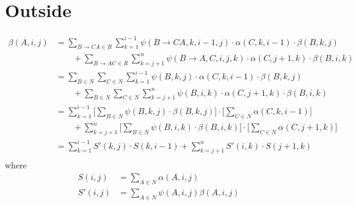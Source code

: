 \documentclass{article}
\begin{document}
\section{Outside}
\begin{align*}
    \beta(A, i, j) &= \sum_{B \to C A \in R} \sum_{k=1}^{i-1} \psi(B \to C A, k, i-1, j) \cdot \alpha(C, k, i-1) \cdot \beta(B, k, j) \\
            &\qquad + \sum_{B \to A C \in R} \sum_{k=j+1}^{n} \psi(B \to A, C, i, j, k) \cdot \alpha(C, j+1, k) \cdot \beta(B, i, k) \\
        &= \sum_{B \in N} \sum_{C \in N} \sum_{k=1}^{i-1} \psi(B, k, j) \cdot \alpha(C, k, i-1) \cdot \beta(B, k, j) \\
            &\qquad + \sum_{B \in N} \sum_{C \in N} \sum_{k=j+1}^{n} \psi(B, i, k) \cdot \alpha(C, j+1, k) \cdot \beta(B, i, k) \\
        &=  \sum_{k=1}^{i-1}  \Bigg[ \sum_{B \in N} \psi(B, k, j)  \cdot \beta(B, k, j) \Bigg] \cdot \Bigg[ \sum_{C \in N} \alpha(C, k, i-1) \Bigg] \\
            &\qquad + \sum_{k=j+1}^{n}  \Bigg[ \sum_{B \in N}  \psi(B, i, k) \cdot \beta(B, i, k) \Bigg] \cdot  \Bigg[ \sum_{C \in N} \alpha(C, j+1, k) \Bigg] \\
        &=  \sum_{k=1}^{i-1}  S'(k, j) \cdot S(k, i-1) + \sum_{k=j+1}^{n} S'(i, k) \cdot  S(j+1, k) \\
\end{align*}
where
\begin{align*}
    S(i, j) &= \sum_{A \in N} \alpha(A, i, j) \\
    S'(i, j) &= \sum_{A \in N} \psi(A, i, j) \beta(A, i, j)
\end{align*}
\end{document}
